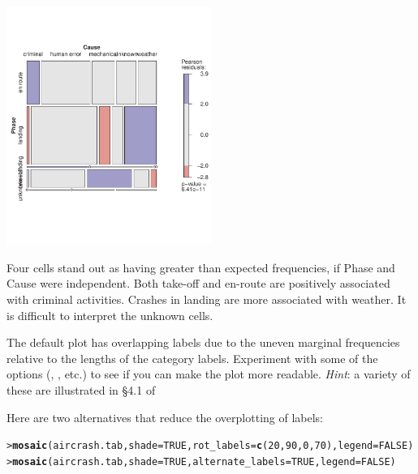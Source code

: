 \documentclass[10pt]{report}\usepackage[]{graphicx}\usepackage[]{color}
\makeatletter
\newcommand{\hlnum}[1]{\textcolor[rgb]{0.686,0.059,0.569}{#1}}%
\newcommand{\hlstd}[1]{\textcolor[rgb]{0.345,0.345,0.345}{#1}}%
\newcommand{\hlkwc}[1]{\textcolor[rgb]{0.333,0.667,0.333}{#1}}%
\newcommand{\hlkwd}[1]{\textcolor[rgb]{0.737,0.353,0.396}{\textbf{#1}}}%
\newenvironment{kframe}{%
 \def\at@end@of@kframe{}%
 \ifinner\ifhmode%
  \def\at@end@of@kframe{\end{minipage}}%
  \begin{minipage}{\columnwidth}%
 \fi\fi%
 \def\FrameCommand##1{\hskip\@totalleftmargin \hskip-\fboxsep
 \colorbox{shadecolor}{##1}\hskip-\fboxsep
     \hskip-\linewidth \hskip-\@totalleftmargin \hskip\columnwidth}%
 \MakeFramed {\advance\hsize-\width
   \@totalleftmargin\z@ \linewidth\hsize
   \@setminipage}}%
 {\par\unskip\endMakeFramed%
 \at@end@of@kframe}
\newenvironment{knitrout}{}{} %
\renewenvironment{knitrout}{\small\renewcommand{\baselinestretch}{.85}}{} %
\makeatother
\begin{document}
\begin{Exercises}
\begin{enumerate*}
\begin{ans}
\begin{knitrout}
\centerline{\includegraphics[width=0.5\textwidth]{soln/fig/ex5_2a-1} }



\end{knitrout}
    Four cells stand out as having greater than expected frequencies, if Phase and Cause were independent. 
    Both take-off and en-route are positively associated with criminal activities.
    Crashes in landing are more associated with weather.  It is difficult to interpret the unknown cells.
    \end{ans}
    
    
    \item The default plot has overlapping labels due to the uneven marginal frequencies relative to the lengths of the category
    labels.  Experiment with some of the  options (, , etc.)
    to see if you can make the plot more readable. \emph{Hint}: a variety of these are illustrated in \S 4.1 of 
    \begin{ans}
    Here are two alternatives that reduce the overplotting of labels:
\begin{knitrout}\footnotesize
{}\color{fgcolor}\begin{kframe}
\begin{alltt}
\hlstd{> }\hlkwd{mosaic}\hlstd{(aircrash.tab,} \hlkwc{shade}\hlstd{=}\hlnum{TRUE}\hlstd{,} \hlkwc{rot_labels}\hlstd{=}\hlkwd{c}\hlstd{(}\hlnum{20}\hlstd{,}\hlnum{90}\hlstd{,}\hlnum{0}\hlstd{,}\hlnum{70}\hlstd{),} \hlkwc{legend}\hlstd{=}\hlnum{FALSE}\hlstd{)}
\hlstd{> }\hlkwd{mosaic}\hlstd{(aircrash.tab,} \hlkwc{shade}\hlstd{=}\hlnum{TRUE}\hlstd{,} \hlkwc{alternate_labels}\hlstd{=}\hlnum{TRUE}\hlstd{,} \hlkwc{legend}\hlstd{=}\hlnum{FALSE}\hlstd{)}
\end{alltt}
\end{kframe}


\end{knitrout}
\end{ans}
\end{enumerate*}
\end{Exercises}
\end{document}
